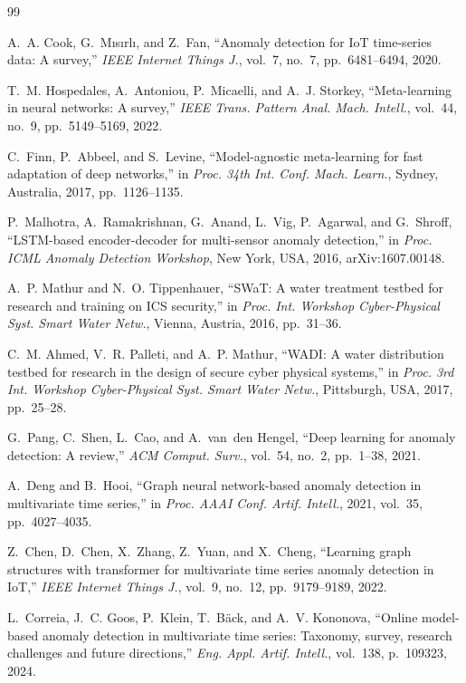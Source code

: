 \documentclass[conference]{IEEEtran}
\begin{document}
\begin{thebibliography}{99}

 A.~A. Cook, G.~M{\i}s{\i}rl{\i}, and Z.~Fan, ``Anomaly
detection for IoT time-series data: A survey,'' \textit{IEEE Internet Things
J.}, vol.~7, no.~7, pp.~6481--6494, 2020.

 T.~M. Hospedales, A.~Antoniou, P.~Micaelli, and
A.~J. Storkey, ``Meta-learning in neural networks: A survey,'' \textit{IEEE
Trans. Pattern Anal. Mach. Intell.}, vol.~44, no.~9, pp.~5149--5169, 2022.

 C.~Finn, P.~Abbeel, and S.~Levine, ``Model-agnostic
meta-learning for fast adaptation of deep networks,'' in \textit{Proc. 34th
Int. Conf. Mach. Learn.}, Sydney, Australia, 2017, pp.~1126--1135.

 P.~Malhotra, A.~Ramakrishnan, G.~Anand, L.~Vig,
P.~Agarwal, and G.~Shroff, ``LSTM-based encoder-decoder for multi-sensor
anomaly detection,'' in \textit{Proc. ICML Anomaly Detection Workshop}, New
York, USA, 2016, arXiv:1607.00148.

 A.~P. Mathur and N.~O. Tippenhauer, ``SWaT: A water
treatment testbed for research and training on ICS security,'' in
\textit{Proc. Int. Workshop Cyber-Physical Syst. Smart Water Netw.}, Vienna,
Austria, 2016, pp.~31--36.

 C.~M. Ahmed, V.~R. Palleti, and A.~P. Mathur, ``WADI: A
water distribution testbed for research in the design of secure cyber
physical systems,'' in \textit{Proc. 3rd Int. Workshop Cyber-Physical Syst.
Smart Water Netw.}, Pittsburgh, USA, 2017, pp.~25--28.

 G.~Pang, C.~Shen, L.~Cao, and A.~van~den Hengel, ``Deep
learning for anomaly detection: A review,'' \textit{ACM Comput. Surv.},
vol.~54, no.~2, pp.~1--38, 2021.

 A.~Deng and B.~Hooi, ``Graph neural network-based anomaly
detection in multivariate time series,'' in \textit{Proc. AAAI Conf. Artif.
Intell.}, 2021, vol.~35, pp.~4027--4035.

 Z.~Chen, D.~Chen, X.~Zhang, Z.~Yuan, and X.~Cheng,
``Learning graph structures with transformer for multivariate time series
anomaly detection in IoT,'' \textit{IEEE Internet Things J.}, vol.~9,
no.~12, pp.~9179--9189, 2022.

 L.~Correia, J.~C. Goos, P.~Klein, T.~B{\"a}ck, and
A.~V. Kononova, ``Online model-based anomaly detection in multivariate time
series: Taxonomy, survey, research challenges and future directions,''
\textit{Eng. Appl. Artif. Intell.}, vol.~138, p.~109323, 2024.


\end{thebibliography}
\end{document}
